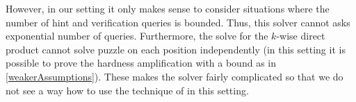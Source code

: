 However, in our setting it only makes sense to consider situations where the number of hint and verification queries is bounded.
Thus, this solver cannot asks exponential number of queries. Furthermore, the solve for the $k$-wise direct product cannot solve puzzle on each position
independently (in this setting it is possible to prove the hardness amplification with a bound as in \ref{weakerAssumptions}).
These makes the solver fairly complicated so that we do not see a way how to use the technique of \cite{haitner2009possibility} in this setting.


%
%
